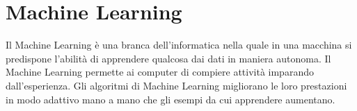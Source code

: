 \documentclass[a4paper,12pt]{report}
\begin{document}

        




\newpage
\section{Machine Learning}
Il Machine Learning \cite{machine_learning_oreilly} è una branca dell'informatica nella quale in una macchina si predispone l'abilità di apprendere qualcosa dai dati in maniera autonoma.
Il Machine Learning permette ai computer di compiere attività imparando dall'esperienza. \newline
Gli algoritmi di Machine Learning migliorano le loro prestazioni in modo adattivo mano a mano che gli esempi da cui apprendere aumentano.
\end{document}

